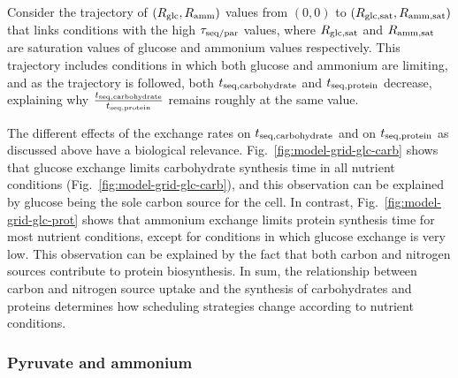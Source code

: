 Consider the trajectory of $(R_{\mathrm{glc}}, R_{\mathrm{amm}})$ values from $(0, 0)$ to $(R_{\mathrm{glc, sat}}, R_{\mathrm{amm, sat}})$ that links conditions with the high $\tau_{\mathrm{seq}/\mathrm{par}}$ values, where $R_{\mathrm{glc, sat}}$ and $R_{\mathrm{amm, sat}}$ are saturation values of glucose and ammonium values respectively.
This trajectory includes conditions in which both glucose and ammonium are limiting, and as the trajectory is followed, both $t_{\mathrm{seq},\mathrm{carbohydrate}}$ and $t_{\mathrm{seq},\mathrm{protein}}$ decrease, explaining why $\frac{t_{\mathrm{seq},\mathrm{carbohydrate}}}{t_{\mathrm{seq},\mathrm{protein}}}$ remains roughly at the same value.

The different effects of the exchange rates on $t_{\mathrm{seq},\mathrm{carbohydrate}}$ and on $t_{\mathrm{seq},\mathrm{protein}}$ as discussed above have a biological relevance.
Fig.\ \ref{fig:model-grid-glc-carb} shows that glucose exchange limits carbohydrate synthesis time in all nutrient conditions (Fig.\ \ref{fig:model-grid-glc-carb}), and this observation can be explained by glucose being the sole carbon source for the cell.
In contrast, Fig.\ \ref{fig:model-grid-glc-prot} shows that ammonium exchange limits protein synthesis time for most nutrient conditions, except for conditions in which glucose exchange is very low.
This observation can be explained by the fact that both carbon and nitrogen sources contribute to protein biosynthesis.
In sum, the relationship between carbon and nitrogen source uptake and the synthesis of carbohydrates and proteins determines how scheduling strategies change according to nutrient conditions.


\subsubsection{Pyruvate and ammonium}
\label{subsec:model-grid-pyruvate}

